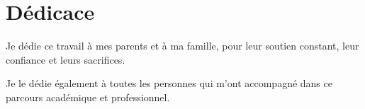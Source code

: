 ﻿\chapter*{Dédicace}

Je dédie ce travail à mes parents et à ma famille, pour leur soutien constant,
leur confiance et leurs sacrifices.

Je le dédie également à toutes les personnes qui m'ont accompagné dans ce
parcours académique et professionnel.

\cleardoublepage

